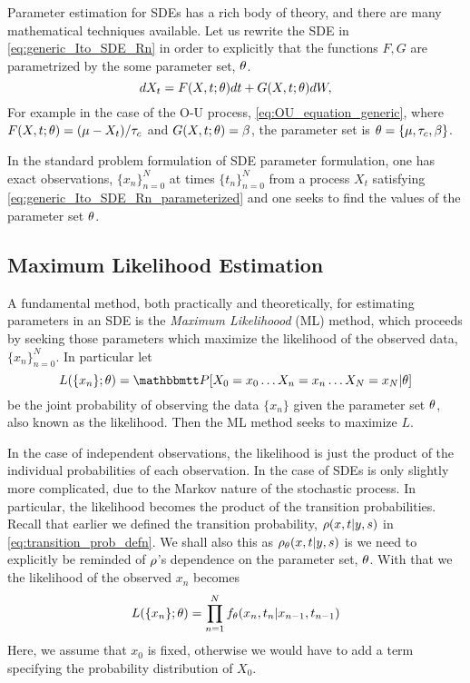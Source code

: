 Parameter estimation for SDEs has a rich body of theory, \cite{??} and there are
many mathematical techniques available. Let us rewrite the SDE
in \cref{eq:generic_Ito_SDE_Rn} in order to explicitly that the 
functions $F, G$ are parametrized by the some parameter set, ${ \theta}$.
\begin{equation}
dX_t = F(X,t;{ \theta}) dt + G(X,t;{ \theta}) dW,
\label{eq:generic_Ito_SDE_Rn_parameterized}
\end{equation}
For example in the case of the O-U process, \cref{eq:OU_equation_generic},
where $F(X,t;{ \theta}) = ({\mu } - {X_t})/{{ \tau_{c} }}$ and $G(X,t;{ \theta}) = \beta$, the
parameter set is ${ \theta} = \{{\mu }, { \tau_{c} }, \beta\}$.

In the standard problem formulation of SDE parameter formulation, one has exact
observations, $\{x_n\}_{n=0}^N$ at times $\{t_n\}_{n=0}^N$ from a process $X_t$
satisfying \cref{eq:generic_Ito_SDE_Rn_parameterized} and one seeks to find the
values of the parameter set ${ \theta}$.

\subsection{Maximum Likelihood Estimation}
A fundamental method, both
practically and theoretically, for estimating parameters in an SDE is the {\sl Maximum
Likelihoood} (ML) method, which proceeds by seeking those parameters which
maximize the likelihood of the observed data, $\{x_n\}_{n=0}^N$. In particular
let $$L(\{x_n\}; \th) = \Prob[ X_0 = x_0\ldots X_n = x_n\ldots X_N = x_N |
\th]$$ be the joint probability of observing the data $\{x_n\}$ given the
parameter set ${ \theta}$, also known as the likelihood. Then the ML method seeks to
maximize $L$.

In the case of independent observations, the
likelihood is just the product of the individual probabilities of each observation. In the case of SDEs is only
slightly more complicated, due to the Markov nature of the stochastic process. In particular,
the likelihood becomes the product of the transition probabilities. Recall that
earlier we defined the transition probability, ${\rho}(x,t| y,s)$ in
\cref{eq:transition_prob_defn}. We shall also this as ${\rho}_{ \theta}(x,t|
y,s)$ is we need to explicitly be reminded of ${\rho}$'s dependence on the
parameter set, ${ \theta}$. With that we the likelihood of the observed $x_n$
becomes
\begin{equation}
L(\{x_n\}; { \theta}) = \prod_{n=1}^{N} f_{ \theta}(x_n, t_n| x_{n-1}, t_{n-1})
\label{eq:SDE_discrete_likelihood}
\end{equation}
Here, we assume that $x_0$ is fixed, otherwise we would have to add a term
specifying the probability distribution of $X_0$.

